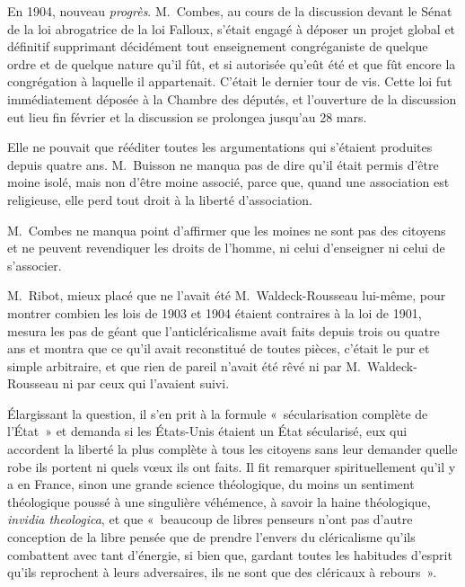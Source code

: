 \documentclass[french,twoside]{book} %
\newcommand{\astertri}{\medskip\par\centerline{\color{rubric}\large\selectfont{\syms ✻\,✻\,✻}}\medskip\par}%
\begin{document}
\astertri

\noindent En 1904, nouveau {\itshape progrès}. M. Combes, au cours de la discussion devant le Sénat de la loi abrogatrice de la loi Falloux, s’était engagé à déposer un projet global et définitif supprimant décidément tout enseignement congréganiste de quelque ordre et de quelque nature qu’il fût, et si autorisée qu’eût été et que fût encore la congrégation à laquelle il appartenait. C’était le dernier tour de vis. Cette loi fut immédiatement déposée à la Chambre des députés, et l’ouverture de la discussion eut lieu fin février et la discussion se prolongea jusqu’au 28 mars.\par
Elle ne pouvait que rééditer toutes les argumentations qui s’étaient produites depuis quatre ans. M. Buisson ne manqua pas de dire qu’il était permis d’être moine isolé, mais non d’être moine associé, parce que, quand une association est religieuse, elle perd tout droit à la liberté d’association.\par
M. Combes ne manqua point d’affirmer que les moines ne sont pas des citoyens et ne peuvent revendiquer les droits de l’homme, ni celui d’enseigner ni celui de s’associer.\par
M. Ribot, mieux placé que ne l’avait été M. Waldeck-Rousseau  lui-même, pour montrer combien les lois de 1903 et 1904 étaient contraires à la loi de 1901, mesura les pas de géant que l’anticléricalisme avait faits depuis trois ou quatre ans et montra que ce qu’il avait reconstitué de toutes pièces, c’était le pur et simple arbitraire, et que rien de pareil n’avait été rêvé ni par M. Waldeck-Rousseau ni par ceux qui l’avaient suivi.\par
Élargissant la question, il s’en prit à la formule « sécularisation complète de l’État » et demanda si les États-Unis étaient un État sécularisé, eux qui accordent la liberté la plus complète à tous les citoyens sans leur demander quelle robe ils portent ni quels vœux ils ont faits. Il fit remarquer spirituellement qu’il y a en France, sinon une grande science théologique, du moins un sentiment théologique poussé à une singulière véhémence, à savoir la haine théologique, {\itshape invidia theologica}, et que « beaucoup de libres penseurs n’ont pas d’autre conception de la libre pensée que de prendre l’envers du cléricalisme qu’ils combattent avec tant d’énergie, si bien que, gardant toutes les habitudes d’esprit qu’ils reprochent à leurs adversaires, ils ne sont que des cléricaux à rebours ».\par
\end{document}
